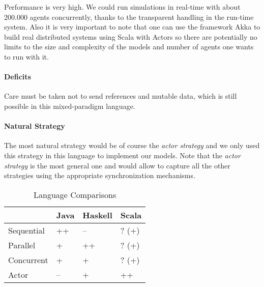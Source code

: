 Performance is very high. We could run simulations in real-time with about 200.000 agents concurrently, thanks to the transparent handling in the run-time system. Also it is very important to note that one can use the framework Akka to build real distributed systems using Scala with Actors so there are potentially no limits to the size and complexity of the models and number of agents one wants to run with it.

\paragraph{Deficits}
Care must be taken not to send references and mutable data, which is still possible in this mixed-paradigm language.

\paragraph{Natural Strategy}
The most natural strategy would be of course the \textit{actor strategy} and we only used this strategy in this language to implement our models. Note that the \textit{actor strategy} is the most general one and would allow to capture all the other strategies using the appropriate synchronization mechanisms.



\begin{table*}[t]
\centering
\caption{Language Comparisons}
\label{tab:language_comparisons}
\begin{tabular}{l || l | l | l  }
	 			& Java 	& Haskell 	& Scala	\\ \hline \hline

Sequential		& ++	& --		& ? (+)		\\  
Parallel		& +		& ++		& ?	(+)	\\  
Concurrent		& +		& +			& ?	(+)	\\  
Actor			& --	& +			& ++	\\  

\end{tabular}
\end{table*}